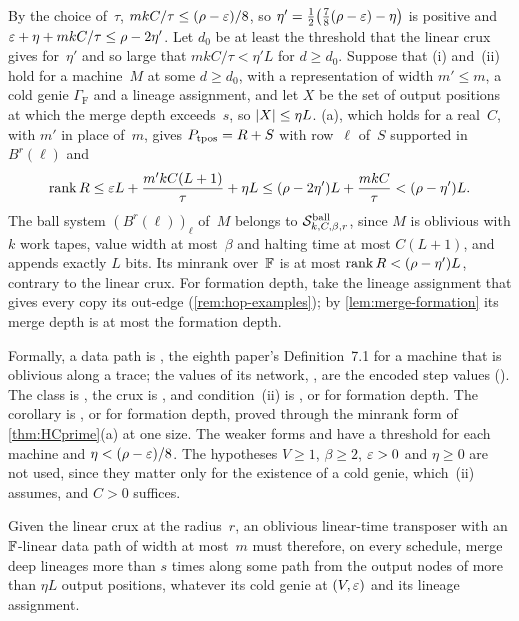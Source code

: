 \begin{outline}
By the choice of~$\tau$, $mkC/\tau\le(\rho-\varepsilon)/8$, so $\eta'=\frac12\bigl(\frac78(\rho-\varepsilon)-\eta\bigr)$ is positive and
$\varepsilon+\eta+mkC/\tau\le\rho-2\eta'$. Let $d_0$ be at least the threshold that the linear crux gives for~$\eta'$ and so
large that $mkC/\tau<\eta'L$ for $d\ge d_0$. Suppose that (i) and~(ii) hold for a machine~$M$ at some $d\ge d_0$, with a
representation of width $m'\le m$, a cold genie $\Gamma_{\mathrm F}$ and a lineage assignment, and let $X$ be the set of
output positions at which the merge depth exceeds~$s$, so $\lvert X \rvert\le\eta L$. (a), which holds for a
real~$C$, with $m'$ in place of~$m$, gives $P_{\operatorname{tpos}}=R+S$ with row~$\ell$ of~$S$ supported in $B^r(\ell)$ and
\[
  \operatorname{rank} R\le\varepsilon L+\frac{m'kC(L+1)}\tau+\eta L\le(\rho-2\eta')L+\frac{mkC}\tau<(\rho-\eta')L .
\]
The ball system $(B^r(\ell))_\ell$ of~$M$ belongs to $\mathcal S^{\mathrm{ball}}_{k,C,\beta,r}$, since $M$ is oblivious with $k$ work tapes,
value width at most~$\beta$ and halting time at most $C(L+1)$, and appends exactly $L$ bits. Its minrank over~$\mathbb{F}$ is at
most $\operatorname{rank} R<(\rho-\eta')L$, contrary to the linear crux. For formation depth, take the lineage assignment that gives
every copy its out-edge (\cref{rem:hop-examples}); by \cref{lem:merge-formation} its merge depth is at most the formation
depth.

Formally, a data path is , the eighth paper's Definition~7.1 for a machine that is oblivious
along a trace; the values of its network, , are the encoded step values
(). The class is , the crux is ,
and condition~(ii) is , or  for formation depth. The
corollary is , or  for formation depth, proved
through the minrank form  of \cref{thm:HCprime}(a) at one size. The
weaker forms  and  have a threshold for each machine and
$\eta<(\rho-\varepsilon)/8$. The hypotheses $V\ge1$, $\beta\ge2$, $\varepsilon>0$ and $\eta\ge0$ are not used, since they matter only
for the existence of a cold genie, which~(ii) assumes, and $C>0$ suffices.
\end{outline}

Given the linear crux at the radius~$r$, an oblivious linear-time transposer with an $\mathbb{F}$-linear data path of width at
most~$m$ must therefore, on every schedule, merge deep lineages more than $s$ times along some path from the output
nodes of more than $\eta L$ output positions, whatever its cold genie at $(V,\varepsilon)$ and its lineage assignment.

